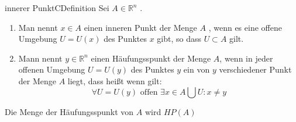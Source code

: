 \documentclass[11.5 pt, a4paper]{memoir}
\begin{document}
\begin{ibox}{innerer Punkt}{CDefinition}
   Sei $ A \in \mathbb{R}^n $ .
   \begin{enumerate}[label=\alph*)]
   	\item Man nennt $ x \in A $ einen inneren Punkt der Menge $ A $ , wenn es eine offene Umgebung $ U = U(x) $ des Punktes $ x $ gibt,
		so dass $ U \subset A $ gilt.
    \item Mann nennt $ y \in \mathbb{R}^n $ einen Häufungsspunkt der Menge $ A $, wenn in jeder offenen Umgebung $ U = U(y) $ des
		Punktes $ y $ ein von $ y $ verschiedener Punkt der Menge $ A $ liegt, dass heißt wenn gilt:
		$$ \forall U = U(y) \text{ offen } \exists x \in A \bigcup U : x \neq y $$
		
   \end{enumerate}
  Die Menge der Häufungsspunkt von $ A $ wird $ HP(A) $ 
\end{ibox}
\end{document}
